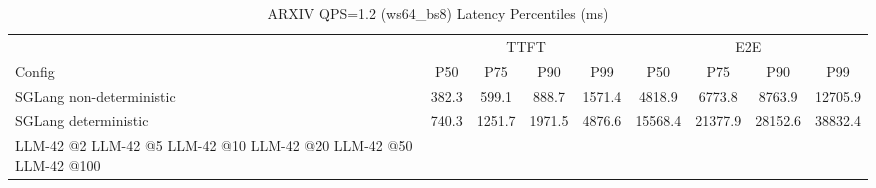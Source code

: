 \begin{table}[htbp]
\centering
\caption{ARXIV QPS=1.2 (ws64_bs8) Latency Percentiles (ms)}
\label{tab:arxiv_qps1.2_ws64_bs8}
\begin{tabular}{l|cccc|cccc}
\toprule
& \multicolumn{4}{c|}{TTFT} & \multicolumn{4}{c}{E2E} \\
Config & P50 & P75 & P90 & P99 & P50 & P75 & P90 & P99 \\
\midrule
SGLang non-deterministic & 382.3 & 599.1 & 888.7 & 1571.4 & 4818.9 & 6773.8 & 8763.9 & 12705.9 \\
SGLang deterministic & 740.3 & 1251.7 & 1971.5 & 4876.6 & 15568.4 & 21377.9 & 28152.6 & 38832.4 \\
LLM-42 @2%
LLM-42 @5%
LLM-42 @10%
LLM-42 @20%
LLM-42 @50%
LLM-42 @100%
\bottomrule
\end{tabular}
\end{table}
